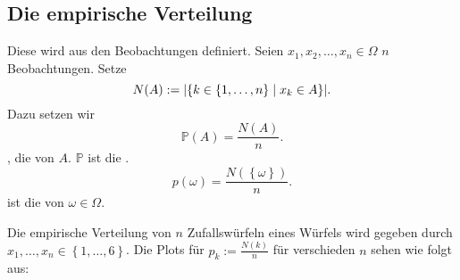 \subsection{Die empirische Verteilung}
Diese wird aus den Beobachtungen definiert.
Seien $x_1,x_2,\ldots,x_n \in \Omega$ $n$ Beobachtungen. Setze
 \[
     N(A) := \lvert\left \{k\in \left \{1,\ldots,n\right\} \mid  x_k \in A\right\} \rvert 
.\] 
Dazu setzen wir
\[
    \mathbb{P}(A) = \frac{N(A)}{n}
.\] 
, die  von $A$.  $\mathbb{P}$ ist die .  
\[
    p(\omega) = \frac{N(\left \{\omega\right\} )}{n}
.\] 
ist die  von $\omega\in \Omega$.

\begin{example}
    Die empirische Verteilung von $n$ Zufallswürfeln eines Würfels wird gegeben durch $x_1,\ldots,x_n \in \left \{1,\ldots,6\right\} $. Die Plots für $p_k := \frac{N(k)}{n}$ für verschieden $n$ sehen wie folgt aus:
\end{example}
